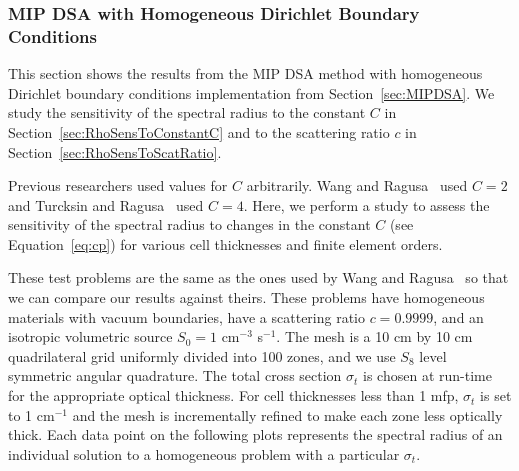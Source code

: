 \documentclass[12pt,letterpaper]{article}
\begin{document}
\subsubsection{MIP DSA with Homogeneous Dirichlet Boundary Conditions}
\label{sec:MIPDSADirichlet}
This section shows the results from the MIP DSA method with homogeneous Dirichlet boundary conditions implementation from Section~\ref{sec:MIPDSA}. We study the sensitivity of the spectral radius to the constant $C$ in Section~\ref{sec:RhoSensToConstantC} and to the scattering ratio $c$ in Section~\ref{sec:RhoSensToScatRatio}.

\label{sec:RhoSensToConstantC}
Previous researchers used values for $C$ arbitrarily. Wang and Ragusa~\cite{WangRagusaDSA} used $C = 2$ and Turcksin and Ragusa~\cite{TurcksinDiscontinuousDSA} used $C = 4$. Here, we perform a study to assess the sensitivity of the spectral radius to changes in the constant $C$ (see Equation~\ref{eq:cp}) for various cell thicknesses and finite element orders. 

These test problems are the same as the ones used by Wang and Ragusa~\cite{WangRagusaDSA} so that we can compare our results against theirs. These problems have homogeneous materials with vacuum boundaries, have a scattering ratio $c=0.9999$, and an isotropic volumetric source $S_0 = 1$ cm$^{-3}$ s$^{-1}$. The mesh is a 10 cm by 10 cm quadrilateral grid uniformly divided into 100 zones, and we use $S_8$ level symmetric angular quadrature. The total cross section $\sigma_t$ is chosen at run-time for the appropriate optical thickness. For cell thicknesses less than 1 mfp, $\sigma_t$ is set to 1 cm$^{-1}$ and the mesh is incrementally refined to make each zone less optically thick. Each data point on the following plots represents the spectral radius of an individual solution to a homogeneous problem with a particular $\sigma_t$.
\end{document}
